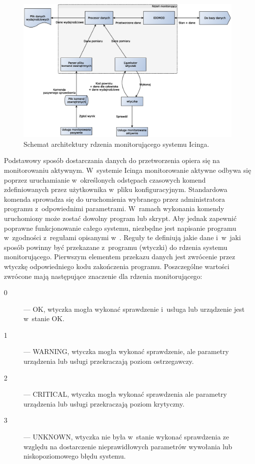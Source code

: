 \begin{figure}[ht]
  \caption{Schemat architektury rdzenia monitorującego systemu
    Icinga.}
  \label{fig:icingaCoreArch}
\includegraphics[width=1\textwidth]{img/icingaCoreArch}
\end{figure}


Podstawowy sposób dostarczania danych do przetworzenia opiera się na
monitorowaniu aktywnym. W~systemie Icinga monitorowanie aktywne odbywa
się poprzez uruchamianie w~określonych odstępach czasowych komend
zdefiniowanych przez użytkownika w~pliku konfiguracyjnym. Standardowa
komenda sprowadza się do uruchomienia wybranego przez administratora
programu z~odpowiednimi parametrami. W~ramach wykonania komendy
uruchomiony może zostać dowolny program lub skrypt. Aby jednak
zapewnić poprawne funkcjonowanie całego systemu, niezbędne jest
napisanie programu w~zgodności z~regułami opisanymi
w~\cite{www:NagiosPluginsTutorial}. Reguły te definiują jakie dane
i~w~jaki sposób powinny być przekazane z~programu (wtyczki) do rdzenia
systemu monitorującego. Pierwszym elementem przekazu danych jest
zwrócenie przez wtyczkę odpowiedniego kodu zakończenia
programu. Poszczególne wartości zwrócone mają następujące znaczenie
dla rdzenia monitorującego:

\begin{description}
\item[0] --- OK, wtyczka mogła wykonać sprawdzenie i~usługa lub urządzenie
  jest w~stanie OK.
\item[1] --- WARNING, wtyczka mogła wykonać sprawdzenie, ale parametry
  urządzenia lub usługi przekraczają poziom ostrzegawczy.
\item[2] --- CRITICAL, wtyczka mogła wykonać sprawdzenia ale parametry
  urządzenia lub usługi przekraczają poziom krytyczny.
\item[3] --- UNKNOWN, wtyczka nie była w~stanie wykonać sprawdzenia ze
  względu na dostarczenie nieprawidłowych parametrów wywołania lub
  niskopoziomowego błędu systemu.
\end{description}

